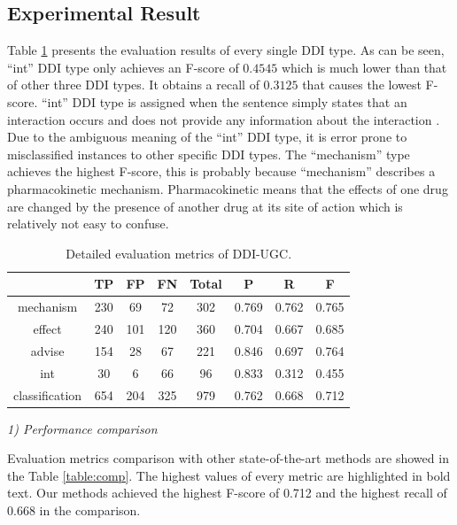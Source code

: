 \documentclass[conference]{IEEEtran}
\begin{document}
\subsection{Experimental Result}

Table \ref{table:class_metric} presents the evaluation results of every single DDI type.
As can be seen, ``int'' DDI type only achieves an F-score of $0.4545$ which is much lower than that of other three DDI types.
It obtains a recall of $0.3125$ that causes the lowest F-score.
``int'' DDI type is assigned when the sentence simply states that an interaction occurs
and does not provide any information about the interaction \cite{segura-bedmar_semeval-2013_2013}.
Due to the ambiguous meaning of the ``int'' DDI type, it is error prone to misclassified instances to other specific DDI types.
The ``mechanism'' type achieves the highest F-score, this is probably because ``mechanism'' describes a pharmacokinetic mechanism.
Pharmacokinetic means that the effects of one drug are changed by the presence of another drug at its site of action which is relatively not easy to confuse.

\begin{table}
\caption{Detailed evaluation metrics of DDI-UGC.}
\normalsize
\label{table:class_metric}
\begin{center}
\begin{tabular}{cccccccc}
\hline
& TP & FP & FN & Total &P & R & F \\\hline
mechanism &  230 & 69 & 72 & 302 & 0.769 & 0.762 & 0.765\\
effect &  240 & 101 & 120 & 360 & 0.704 & 0.667 & 0.685\\
advise &  154 & 28 & 67 & 221 & 0.846 & 0.697 & 0.764 \\
int &  30 & 6 & 66 & 96 & 0.833 & 0.312 & 0.455\\
classification & 654 & 204 & 325 & 979 & 0.762 & 0.668 & 0.712\\
\hline
\end{tabular}
\end{center}
\end{table}

\bigbreak
\emph{1) Performance comparison}
\bigbreak

Evaluation metrics comparison with other state-of-the-art methods are showed in the Table \ref{table:comp}.
The highest values of every metric are highlighted in bold text.
Our methods achieved the highest F-score of 0.712 and the highest recall of 0.668 in the comparison.
\end{document}
